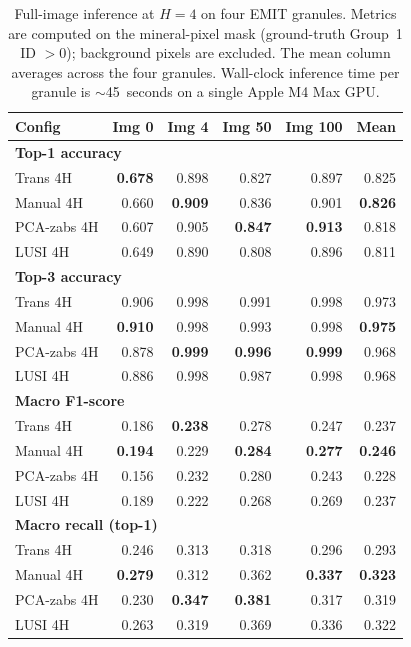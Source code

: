 \documentclass[11pt]{report}
\begin{document}
\begin{table}[!htbp]
\centering
\small
\caption{Full-image inference at $H = 4$ on four EMIT granules. Metrics are computed on the mineral-pixel mask (ground-truth Group~1 ID $> 0$); background pixels are excluded. The mean column averages across the four granules. Wall-clock inference time per granule is $\sim$45~seconds on a single Apple M4 Max GPU.}
\label{tab:granule_inference}
\begin{tabular}{lrrrrr}
\hline
\textbf{Config} & \textbf{Img 0} & \textbf{Img 4} & \textbf{Img 50} & \textbf{Img 100} & \textbf{Mean} \\
\hline
\multicolumn{6}{l}{\textbf{Top-1 accuracy}} \\
Trans 4H        & \textbf{0.678} & 0.898          & 0.827          & 0.897          & 0.825 \\
Manual 4H       & 0.660          & \textbf{0.909} & 0.836          & 0.901          & \textbf{0.826} \\
PCA-zabs 4H     & 0.607          & 0.905          & \textbf{0.847} & \textbf{0.913} & 0.818 \\
LUSI 4H         & 0.649          & 0.890          & 0.808          & 0.896          & 0.811 \\
\hline
\multicolumn{6}{l}{\textbf{Top-3 accuracy}} \\
Trans 4H        & 0.906          & 0.998          & 0.991          & 0.998          & 0.973 \\
Manual 4H       & \textbf{0.910} & 0.998          & 0.993          & 0.998          & \textbf{0.975} \\
PCA-zabs 4H     & 0.878          & \textbf{0.999} & \textbf{0.996} & \textbf{0.999} & 0.968 \\
LUSI 4H         & 0.886          & 0.998          & 0.987          & 0.998          & 0.968 \\
\hline
\multicolumn{6}{l}{\textbf{Macro F1-score}} \\
Trans 4H        & 0.186          & \textbf{0.238} & 0.278          & 0.247          & 0.237 \\
Manual 4H       & \textbf{0.194} & 0.229          & \textbf{0.284} & \textbf{0.277} & \textbf{0.246} \\
PCA-zabs 4H     & 0.156          & 0.232          & 0.280          & 0.243          & 0.228 \\
LUSI 4H         & 0.189          & 0.222          & 0.268          & 0.269          & 0.237 \\
\hline
\multicolumn{6}{l}{\textbf{Macro recall (top-1)}} \\
Trans 4H        & 0.246          & 0.313          & 0.318          & 0.296          & 0.293 \\
Manual 4H       & \textbf{0.279} & 0.312          & 0.362          & \textbf{0.337} & \textbf{0.323} \\
PCA-zabs 4H     & 0.230          & \textbf{0.347} & \textbf{0.381} & 0.317          & 0.319 \\
LUSI 4H         & 0.263          & 0.319          & 0.369          & 0.336          & 0.322 \\
\hline
\end{tabular}
\end{table}
\end{document}
